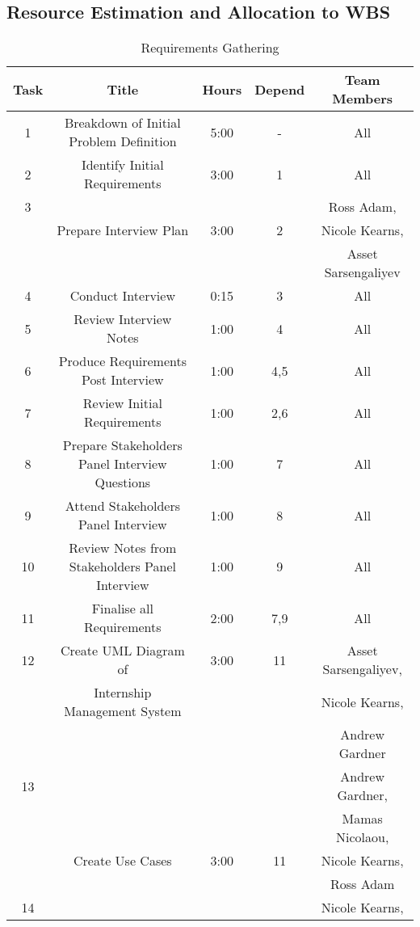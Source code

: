 \documentclass{l3deliverable}
\begin{document}
{\subsection{Resource Estimation and Allocation to WBS\label{sec:allocation}}

\begin{table}[ht]
\caption{Requirements Gathering} %

\begin{tabular}{|c |c |c |c |c |} %
\hline\hline                        %
Task & Title & Hours & Depend & Team Members \\ [0.5ex]
\hline 1 & Breakdown of Initial Problem Definition & 5:00 &-& All\\ %
\hline2 & Identify Initial Requirements & 3:00 &1& All\\
\hline3 & &  && Ross Adam, \\
 &  Prepare Interview Plan&3:00 &2 &Nicole Kearns, \\
 & & & &Asset Sarsengaliyev \\
\hline4 & Conduct Interview & 0:15 &3& All\\
\hline5 & Review Interview Notes& 1:00 &4& All\\
\hline6 & Produce Requirements Post Interview & 1:00 &4,5& All\\
\hline7 & Review Initial Requirements & 1:00 &2,6& All \\
\hline8 & Prepare Stakeholders Panel Interview Questions & 1:00 &7& All\\
\hline9 & Attend Stakeholders Panel Interview & 1:00 &8& All\\
\hline10 & Review Notes from Stakeholders Panel Interview & 1:00 &9& All\\
\hline11 & Finalise all Requirements & 2:00 &7,9& All\\
\hline12 & Create UML Diagram of  & 3:00 &11& Asset Sarsengaliyev, \\
 &Internship Management System& & &Nicole Kearns,  \\
 && & & Andrew Gardner \\
\hline13 & &  && Andrew Gardner, \\
 & & & & Mamas Nicolaou, \\
 & Create Use Cases & 3:00& 11& Nicole Kearns,\\
 & & & & Ross Adam \\
\hline14 &  & && Nicole Kearns, \\

\end{tabular}
\end{table}}
\end{document}
